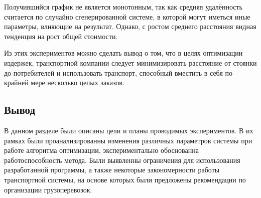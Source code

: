 Получившийся график не является монотонным, так как средняя удалённость считается по случайно сгенерированной системе, в которой могут иметься иные параметры, влияющие на результат. Однако, с ростом среднего расстояния видная тенденция на рост общей стоимости. 

Из этих экспериментов можно сделать вывод о том, что в целях оптимизации издержек, транспортной компании следует минимизировать расстояние от стоянки до потребителей и использовать транспорт, способный вместить в себя по крайней мере несколько целых заказов.

\subsection*{Вывод}
В данном разделе были описаны цели и планы проводимых экспериментов. В их рамках были проанализированны изменения различных параметров системы при работе алгоритма оптимизации, экспериментально обоснованна работоспособность метода. Были выявленны ограничения для использования разработанной программы, а также некоторые закономерности работы транспортной системы, на основе которых были предложены рекомендации по организации грузоперевозок. 

\pagebreak